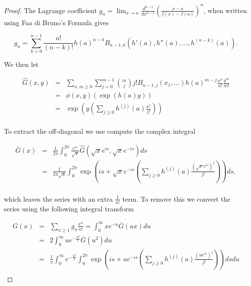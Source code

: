 \documentclass[12pt]{article}
\theoremstyle{plain}
\theoremstyle{definition}
\theoremstyle{remark}
\theoremstyle{definition}
\begin{document}
\begin{proof}
    
The Lagrange coefficient $g_n = \lim_{x \to a}\frac{d^{n-1}}{dx^{n-1}}\left(\frac{x-a}{f(x)-f(a)}\right)^{n}$, when written using Faa di Bruno's Formula gives 

\begin{equation*}
    g_n = \sum_{k=0}^{n-1}\frac{n!}{(n-k)!}h(a)^{n-k}B_{n-1,k
    }(h'(a), h''(a), \dots, h^{(n-k)}(a)).
\end{equation*}

We then let

\begin{eqnarray*}
\hat{G}(x,y) & = & \sum_{n,m\geq0}\sum_{j=0}^{m-1} \binom{m}{j}j!B_{n-1,j}(x_1, \dots)h(a)^{m-j} \frac{x^n}{n!}\frac{y^m}{m!} \\
& = &  \phi(x,y)(\exp(h(a)y)) \\
& = &  \exp\left(y\left(\sum_{j\geq0}h^{(j)}(a) \frac{x^j}{j!}\right)\right)\\
\end{eqnarray*}

To extract the off-diagonal we use compute the complex integral

\begin{eqnarray*}
    \bar{G}(x)& = & \frac{1}{2\pi} \int_0^{2\pi}\frac{e^{is}}{\sqrt{x}}\hat{G}(\sqrt{x}e^{is},\sqrt{x}e^{-is})ds \\
     & = &\frac{1}{2\pi\sqrt{x}} \int_0^{2\pi} \exp\left(is+\sqrt{x}e^{-is}\left(\sum_{j\geq0}h^{(j)}(a) \frac{(\sqrt{x}e^{is})^j}{j!}\right)\right)ds,\\
\end{eqnarray*}

which leaves the series with an extra $\frac{1}{n!}$ term. To remove this we convert the series using the following integral transform 

\begin{eqnarray*}
    G(x)& = & \sum_{n\geq1}g_n \frac{x^n}{n!} = \int_0^\infty xe^{-u}\bar{G}(ux)du \\
    & = & 2\int_0^\infty ue^{-\frac{u^2}{x}}\bar{G}(u^2)du \\
    & = &\frac{1}{\pi} \int_0^\infty e^{-\frac{u^2}{x}} \int_0^{2\pi} \exp\left(is + ue^{-is}\left(\sum_{j\geq0}h^{(j)}(a) \frac{(ue^{is})^j}{j!}\right)\right)ds du \\
\end{eqnarray*}

\end{proof}
\end{document}
